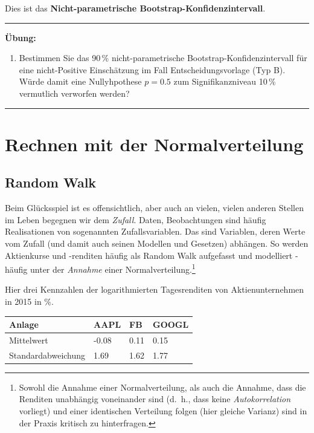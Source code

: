\documentclass[12pt,ngerman,paper=a4,pagesize,DIV=13]{scrreprt}
\providecommand{\tightlist}{%
  \setlength{\itemsep}{0pt}\setlength{\parskip}{0pt}}
\begin{document}
Dies ist das \textbf{Nicht-parametrische Bootstrap-Konfidenzintervall}.

\begin{center}\rule{0.5\linewidth}{\linethickness}\end{center}

\textbf{Übung:}

\begin{enumerate}
\def\labelenumi{\arabic{enumi}.}
\setcounter{enumi}{2}
\tightlist
\item
  Bestimmen Sie das 90\(\,\)\% nicht-parametrische
  Bootstrap-Konfidenzintervall für eine nicht-Positive Einschätzung im
  Fall Entscheidungsvorlage (Typ B). Würde damit eine Nullyhpothese
  \(p=0.5\) zum Signifikanzniveau 10\(\,\)\% vermutlich verworfen
  werden?
\end{enumerate}

\begin{center}\rule{0.5\linewidth}{\linethickness}\end{center}

\hypertarget{rechnen-mit-der-normalverteilung}{%
\section{Rechnen mit der
Normalverteilung}\label{rechnen-mit-der-normalverteilung}}

\hypertarget{random-walk}{%
\subsection{Random Walk}\label{random-walk}}

Beim Glücksspiel ist es offensichtlich, aber auch an vielen, vielen
anderen Stellen im Leben begegnen wir dem \emph{Zufall}. Daten,
Beobachtungen sind häufig Realisationen von sogenannten
Zufallsvariablen. Das sind Variablen, deren Werte vom Zufall (und damit
auch seinen Modellen und Gesetzen) abhängen. So werden Aktienkurse und
-renditen häufig als Random Walk aufgefasst und modelliert - häufig
unter der \emph{Annahme} einer Normalverteilung.\footnote{Sowohl die
  Annahme einer Normalverteilung, als auch die Annahme, dass die
  Renditen unabhängig voneinander sind (d.~h., dass keine
  \emph{Autokorrelation} vorliegt) und einer identischen Verteilung
  folgen (hier gleiche Varianz) sind in der Praxis kritisch zu
  hinterfragen.}

Hier drei Kennzahlen der logarithmierten Tagesrenditen von
Aktienunternehmen in 2015 in \%.

\begin{longtable}[]{@{}llll@{}}
\toprule
Anlage & AAPL & FB & GOOGL\tabularnewline
\midrule
\endhead
Mittelwert & -0.08 & 0.11 & 0.15\tabularnewline
Standardabweichung & 1.69 & 1.62 & 1.77\tabularnewline
\bottomrule
\end{longtable}
\end{document}
